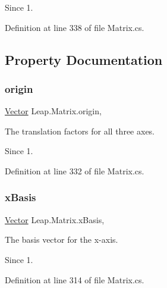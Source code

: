 \begin{DoxySince}{Since}
1. 
\end{DoxySince}


Definition at line 338 of file Matrix.\+cs.



\subsection{Property Documentation}
\mbox{\label{struct_leap_1_1_matrix_a8ba63742492635361dcd771e392bbce6}} 
\subsubsection{\texorpdfstring{origin}{origin}}
{\footnotesize\ttfamily \mbox{\hyperlink{struct_leap_1_1_vector}{Vector}} Leap.\+Matrix.\+origin\hspace{0.3cm}{\ttfamily [get]}, {\ttfamily [set]}}



The translation factors for all three axes. 

\begin{DoxySince}{Since}
1. 
\end{DoxySince}


Definition at line 332 of file Matrix.\+cs.

\mbox{\label{struct_leap_1_1_matrix_a5778d424f6d76d84fe7a479b936b06ad}} 
\subsubsection{\texorpdfstring{xBasis}{xBasis}}
{\footnotesize\ttfamily \mbox{\hyperlink{struct_leap_1_1_vector}{Vector}} Leap.\+Matrix.\+x\+Basis\hspace{0.3cm}{\ttfamily [get]}, {\ttfamily [set]}}



The basis vector for the x-\/axis. 

\begin{DoxySince}{Since}
1. 
\end{DoxySince}


Definition at line 314 of file Matrix.\+cs.

